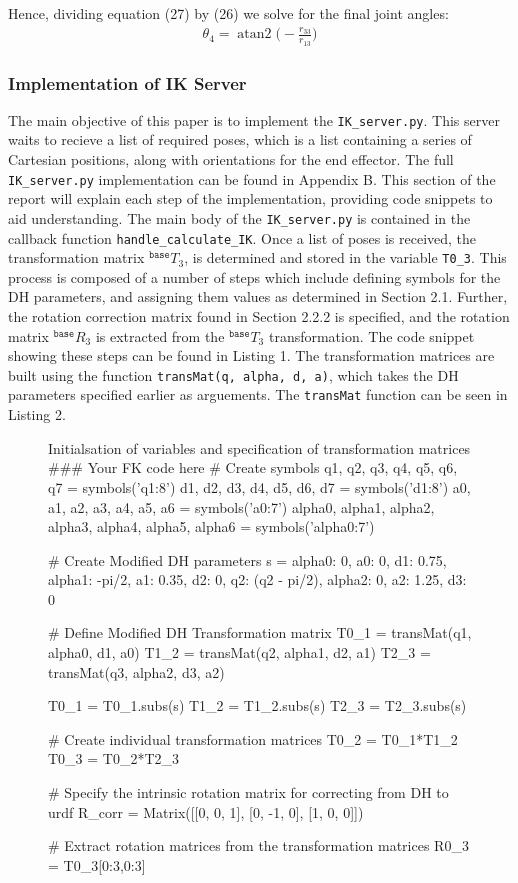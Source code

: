 \documentclass[a4paper]{article}
\DeclareMathOperator{\atantwo}{atan2}
\begin{document}
Hence, dividing equation (27) by (26) we solve for the final joint angles:
\begin{align}
\theta_4 = \atantwo \bigg(-\frac{r_{33}}{r_{13}}\bigg)
\end{align}

\subsubsection{Implementation of IK Server}
The main objective of this paper is to implement the \verb|IK_server.py|. This server waits to recieve a list of required poses, which is a list containing a series of Cartesian positions, along with orientations for the end effector. The full \verb|IK_server.py| implementation can be found in Appendix B. This section of the report will explain each step of the implementation, providing code snippets to aid understanding. The main body of the \verb|IK_server.py| is contained in the callback function \verb|handle_calculate_IK|. Once a list of poses is received, the transformation matrix $^\texttt{base} T_3$, is determined and stored in the variable \verb|T0_3|. This process is composed of a number of steps which include defining symbols for the DH parameters, and assigning them values as determined in Section 2.1. Further, the rotation correction matrix found in Section 2.2.2 is specified, and the rotation matrix $^\texttt{base} R_3$ is extracted from the $^\texttt{base} T_3$ transformation. The code snippet showing these steps can be found in Listing 1. The transformation matrices are built using the function \verb|transMat(q, alpha, d, a)|, which takes the DH parameters specified earlier as arguements. The \verb|transMat| function can be seen in Listing 2. 

\begin{figure}[h]\footnotesize
	\begin{sexylisting}{Initialsation of variables and specification of transformation matrices}
### Your FK code here
# Create symbols
q1, q2, q3, q4, q5, q6, q7 = symbols('q1:8')
d1, d2, d3, d4, d5, d6, d7 = symbols('d1:8')
a0, a1, a2, a3, a4, a5, a6 = symbols('a0:7')
alpha0, alpha1, alpha2, alpha3, alpha4, alpha5, alpha6 = symbols('alpha0:7')

# Create Modified DH parameters
s = {alpha0:     0,    a0:      0,    d1: 0.75,
     alpha1: -pi/2,    a1:   0.35,    d2:    0,    q2: (q2 - pi/2),
     alpha2:     0,    a2:   1.25,    d3:    0}

# Define Modified DH Transformation matrix
T0_1 = transMat(q1, alpha0, d1, a0)
T1_2 = transMat(q2, alpha1, d2, a1)
T2_3 = transMat(q3, alpha2, d3, a2)

T0_1 = T0_1.subs(s)
T1_2 = T1_2.subs(s)
T2_3 = T2_3.subs(s)

# Create individual transformation matrices
T0_2 = T0_1*T1_2
T0_3 = T0_2*T2_3

# Specify the intrinsic rotation matrix for correcting from DH to urdf
R_corr = Matrix([[0,  0, 1],
[0, -1, 0],
[1,  0, 0]])

# Extract rotation matrices from the transformation matrices
R0_3 = T0_3[0:3,0:3]	
	\end{sexylisting}
\end{figure}
\end{document}

